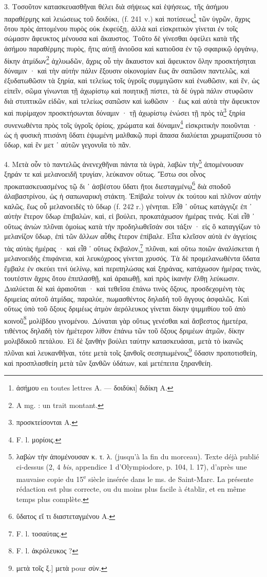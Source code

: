 \documentclass[a4paper, 11pt, oneside, polutonikogreek, french]{article}
\begin{document}
3. Τοσοῦτον κατασκευασθῆναι θέλει διὰ σήψεως καὶ ἑψήσεως, τῆς ἀσήμου παραθέρμης καὶ λειώσεως τοῦ δοιδύκι, (f. 241 v.) καὶ ποτίσεως\footnote{ἀσήμου en toutes lettres A. --- δοιδύκι] διδίκη A.} τῶν ὑγρῶν, ἄχρις ὅτου πρὸς ἀπτομένου πυρὸς οὐκ ἐκφεύξῃ, ἀλλὰ καὶ εἰσκριτικὸν γίνεται ἐν τοῖς σώμασιν ἄφευκτος μένουσα καὶ ἄκαυστος. Τοῦτο δὲ γίνεσθαι ὀφείλει κατὰ τῆς ἀσήμου παραθέρμης πυρὸς, ἥτις αὐτῇ ἀνιοῦσα καὶ κατιοῦσα ἐν τῷ σφαιρικῷ ὀργάνῳ, δίκην ἀτμίδων\footnote{A mg. : un trait montant.} ἀχλυωδῶν, ἄχρις οὗ τὴν ἄκαυστον καὶ ἄφευκτον ὅλην προσκτήσηται δύναμιν · καὶ τὴν αὐτὴν πάλιν ἔξουσιν οἰκονομίαν ἕως ἂν σαπῶσιν παντελῶς, καὶ ἐξυδατωθῶσιν τὰ ξηρία, καὶ τελείως τοῖς ὑγροῖς συμμιγῶσιν καὶ ἑνωθῶσιν, καὶ ἓν, ὡς εἰπεῖν, σῶμα γίνωνται τῇ ἀχωρίστῳ καὶ ποιητικῇ πίστει, τὰ δὲ ὑγρὰ πάλιν στυφῶσιν διὰ στυπτικῶν εἰδῶν, καὶ τελείως σαπῶσιν καὶ ἰωθῶσιν · ἕως καὶ αὐτὰ τὴν ἄφευκτον καὶ πυρίμαχον προσκτήσωνται δύναμιν · τῇ ἀχωρίστῳ ἑνώσει τῇ πρὸς τὰ\footnote{προσκτείσονται A.} ξηρία συνενωθέντα πρὸς τοῖς ὑγροῖς ὁρίοις, χρώματα καὶ δύναμιν\footnote{F. l. μορίοις.} εἰσκριτικὴν ποιοῦνται · ὡς ἡ φυσικὴ πτισάνη ὕδατι ἑψωμένη μαλθακῷ πυρὶ ἅπασα διαλύεται χρωματίζουσα τὸ ὕδωρ, καὶ ἓν μετ ᾽ αὐτῶν γεγονυῖα τὸ πᾶν.

4. Μετὰ οὖν τὸ παντελῶς ἀνενεχθῆναι πάντα τὰ ὑγρὰ, λαβὼν τὴν\footnote{λαβὼν τὴν ἀπομένουσαν κ. τ. λ. (jusqu'à la fin du morceau). Texte déjà publié ci-dessus (2, 4 \emph{bis}, appendice 1 d'Olympiodore, p. 104, l. 17), d'après une mauvaise copie du 15\textsuperscript{e} siècle insérée dans le ms. de Saint-Marc. La présente rédaction est plus correcte, ou du moins plus facile à établir, et en même temps plus complète.} ἀπομένουσαν ξηράν τε καὶ μελανοειδῆ τρυγίαν, λεύκανον οὕτως. Ἔστω σοι οἶνος προκατασκευασμένος τῷ δι ᾽ ἀσβέστου ὕδατι ἤτοι διεσταγμένῳ\footnote{ὕδατος εἴ τι διαστεταγμένου A.} διὰ σποδοῦ ἀλαβαστρίνου, ὡς ἡ σαπωναρικὴ στάκτη. Ἐπίβαλε τοίνυν ἐκ τούτου καὶ πλῦνον αὐτὴν καλῶς, ἕως οὗ μελανοειδὲς τὸ ὕδωρ (f. 242 r.) γένηται. Εἶθ ᾽ οὕτως κατάγγιζε ἐπ ᾽ αὐτὴν ἕτερον ὕδωρ ἐπιβαλὼν, καὶ, εἰ βούλει, προκατάχωσον ἡμέρας τινάς. Καὶ εἶθ ᾽ οὕτως ἀνιὼν πλῦναι ὁμοίως κατὰ τὴν προδηλωθεῖσάν σοι τάξιν · εἰς ὃ καταγγίζων τὸ μελανίζον ὕδωρ, ἐπὶ τῶν ἄλλων αὖθις ἕτερον ἐπίβαλε. Εἶτα κλεῖσον αὐτὰ ἐν ἀγγείοις τὰς αὐτὰς ἡμέρας · καὶ εἶθ ᾽ οὕτως ἔκβαλον,\footnote{F. l. τοσαύτας.} πλῦναι, καὶ οὕτω ποιῶν ἀναλίσκεται ἡ μελανοειδὴς ἐπιφάνεια, καὶ λευκόχροος γίνεται χρυσός. Τὰ δὲ προμελανωθέντα ὕδατα ἔμβαλε ἐν σκεύει τινὶ ὑελίνῳ, καὶ περιπηλώσας καὶ ξηράνας, κατάχωσον ἡμέρας τινὰς, τουτέστιν ἄχρις ὅτου ἐπιπλασθῇ, καὶ ἀραιωθῇ, καὶ πρὸς ἱκανὴν ἔλθῃ λεύκωσιν. Διαλύεται δὲ καὶ ἀραιοῦται · καὶ τεθεῖσα ἐπάνω τινὸς ὄξους, προσδεχομένη τὰς δριμείας αὐτοῦ ἀτμίδας, παραλύε, πωμασθέντος δηλαδὴ τοῦ ἄγγους ἀσφαλῶς. Καὶ οὕτως ὑπὸ τοῦ ὄξους δριμέως ἀτμὸν ἀερόλευκος γίνεται δίκην ψιμμιθίου τοῦ ἀπὸ κοινοῦ\footnote{F. l. ἀκρόλευκος ?} μολίβδου γινομένου. Δύναται γὰρ οὕτως γενέσθαι καὶ ἄσβεστος ἡμετέρα, τιθέντος δηλαδὴ τὸν ἡμέτερον λίθον ἐπάνω τῶν τοῦ ὄξους δριμέων ἀτμῶν, δίκην μολιβδικοῦ πετάλου. Εἰ δὲ ξανθὴν βούλει ταύτην κατασκευάσαι, μετὰ τὸ ἱκανῶς πλῦναι καὶ λευκανθῆναι, τότε μετὰ τοῖς ξανθοῖς σεσηπωμένοις\footnote{μετὰ τοῖς ξ.] μετὰ pour σὺν.} ὕδασιν προποτισθείη, καὶ προσπλασθείη μετὰ τῶν ξανθῶν ὑδάτων, καὶ μετέπειτα ξηρανθείη.
\end{document}
